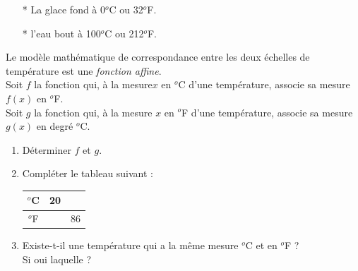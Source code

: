 \begin{itemize}
\item[*] La glace fond à 0$^{o}$C ou 32$^{o}$F.
\item[*] l'eau bout à 100$^{o}$C ou 212$^{o}$F.
\end{itemize}

Le modèle mathématique de correspondance entre les deux échelles de température est une {\it fonction affine}. \\

Soit $f$ la fonction qui, à la mesure$x$ en $^{o}$C d'une température, associe sa mesure $f(x)$ en $^{o}$F.\\

Soit $g$ la fonction qui, à la mesure $x$ en $^{o}$F d'une température, associe sa mesure $g(x)$ en degré $^{o}$C.\\


\begin{enumerate}
\item Déterminer $f$ et $g$.
\item Compléter le tableau suivant : 
\begin{tabular}{c@{$\;\mid\quad$}c@{$\quad\mid\quad$}c@{$\quad$}}
$^{o}$C&20& \\
\hline
$^{o}$F & & 86 \\
\end{tabular}


\item Existe-t-il une température qui a la même mesure $^{o}$C et en $^{o}$F ? \\
Si oui laquelle ? 
\end{enumerate}

